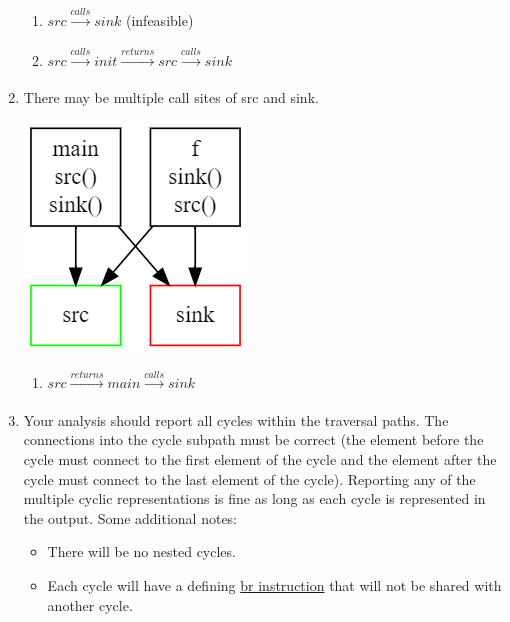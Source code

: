 \documentclass[12pt]{article}
\newcommand{\codeIn}[1]{{\small\tt{#1}}}
\newcommand{\calls}{\xrightarrow[]{calls}}
\newcommand{\returns}{\xrightarrow[]{returns}}
\begin{document}
\begin{enumerate}
    \begin{enumerate}
        \item \codeIn{$src \calls sink$} (infeasible)
        \item \codeIn{$src \calls init \returns src \calls sink$}
    \end{enumerate}

\filbreak
    \item There may be multiple call sites of src and sink.
    \begin{center}
        \includegraphics[scale=0.5]
        {multiplecallsites.png}
        \label{case3}
    \end{center}

    \begin{enumerate}
        \item \codeIn{$src \returns main \calls sink$}
    \end{enumerate}

    \item Your analysis should report all cycles within the traversal paths. The connections into the cycle subpath must be correct (the element before the cycle must connect to the first element of the cycle and the element after the cycle must connect to the last element of the cycle). Reporting any of the multiple cyclic representations is fine as long as each cycle is represented in the output. Some additional notes:
    \begin{itemize}
        \item There will be no nested cycles.
        \item Each cycle will have a defining \href{https://llvm.org/docs/LangRef.html#br-instruction}{br instruction} that will not be shared with another cycle.
    \end{itemize}


\end{enumerate}
\end{document}

